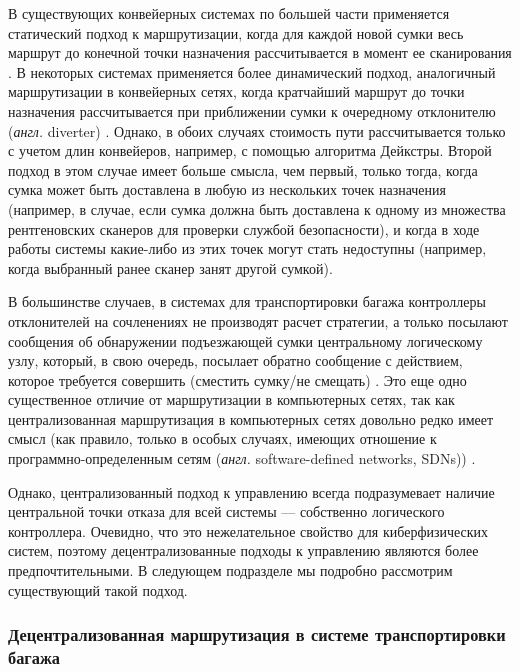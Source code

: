 \documentclass[specification,annotation,times]{itmo-student-thesis}
\theoremstyle{definition}
\begin{document}
В существующих конвейерных системах по большей части применяется статический
подход к маршрутизации, когда для каждой новой сумки весь маршрут до конечной
точки назначения рассчитывается в момент ее сканирования
\cite{johnstone2009status}.
В некоторых системах применяется более динамический подход, аналогичный
маршрутизации в конвейерных сетях, когда кратчайший маршрут до точки назначения
рассчитывается при приближении сумки к очередному отклонителю (\textit{англ.}
diverter) \cite{hallenborg2007decentralized}. Однако, в обоих случаях стоимость
пути рассчитывается только с учетом длин конвейеров, например, с помощью
алгоритма Дейкстры. Второй подход в этом случае имеет больше смысла, чем первый,
только тогда, когда сумка может быть доставлена в любую из нескольких точек
назначения (например, в случае, если сумка должна быть доставлена к одному из
множества рентгеновских сканеров для проверки службой безопасности), и когда в
ходе работы системы какие-либо из этих точек могут стать недоступны (например,
когда выбранный ранее сканер занят другой сумкой).

В большинстве случаев, в системах для транспортировки багажа контроллеры
отклонителей на сочленениях не производят расчет стратегии, а только посылают
сообщения об обнаружении подъезжающей сумки центральному логическому узлу,
который, в свою очередь, посылает обратно сообщение с действием, которое
требуется совершить (сместить сумку/не смещать)
\cite{hallenborg2007decentralized, johnstone2009status}. Это еще одно
существенное отличие от маршрутизации в компьютерных сетях, так как
централизованная маршрутизация в компьютерных сетях довольно редко имеет смысл
(как правило, только в особых случаях, имеющих отношение к
программно-определенным сетям (\textit{англ.} software-defined networks, SDNs))
\cite{mao2017routing, wang2018machine}.

Однако, централизованный подход к управлению всегда подразумевает наличие
центральной точки отказа для всей системы --- собственно логического
контроллера. Очевидно, что это нежелательное свойство для киберфизических
систем, поэтому децентрализованные подходы к управлению являются более
предпочтительными. В следующем подразделе мы подробно рассмотрим существующий
такой подход.

\subsubsection{Децентрализованная маршрутизация в системе транспортировки
  багажа}\label{vyatkin-method}
\end{document}
